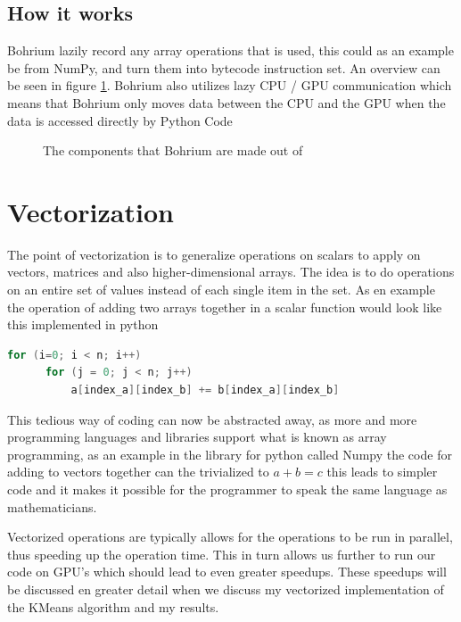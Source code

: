 \documentclass[12pt]{report}
\begin{document}
\subsection{How it works}
\label{subsec:hiw}
Bohrium lazily record any array operations that is used, this could as an example be from NumPy, and turn them into bytecode instruction set. An overview can be seen in figure \ref{fig:bohrium_overview}. Bohrium also utilizes lazy CPU / GPU communication which means that Bohrium only moves data between the CPU and the GPU when the data is accessed directly by Python Code \cite{bohrium_website}

\begin{figure}[H]
  \centering
  
\caption{\label{fig:bohrium_overview}The components that Bohrium are made out of}
\end{figure}

\section{Vectorization}
\label{subsec:vectorization}

The point of vectorization is to generalize operations on scalars to apply on vectors, matrices and also higher-dimensional arrays. The idea is to do operations on an entire set of values instead of each single item in the set. As en example the operation of adding two arrays together in a scalar function would look like this implemented in python
\begin{lstlisting}[language=C]
  for (i=0; i < n; i++)
      for (j = 0; j < n; j++)
          a[index_a][index_b] += b[index_a][index_b]
\end{lstlisting}

This tedious way of coding can now be abstracted away, as more and more programming languages and libraries support what is known as array programming, as an example in the library for python called Numpy the code for adding to vectors together can the trivialized to $a + b = c$ this leads to simpler code and it makes it possible for the programmer to speak the same language as mathematicians.

Vectorized operations are typically allows for the operations to be run in parallel, thus speeding up the operation time. This in turn allows us further to run our code on GPU's which should lead to even greater speedups. These speedups will be discussed en greater detail when we discuss my vectorized implementation of the KMeans algorithm and my results.
\end{document}
